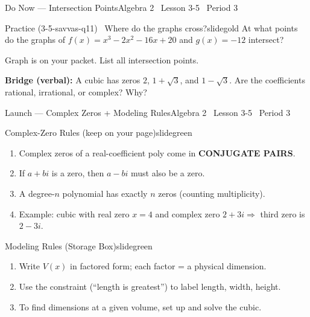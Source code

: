 \documentclass[aspectratio=169, 11pt]{beamer}
\begin{document}

\begin{frame}{Do Now --- Intersection Points}{Algebra 2 \textperiodcentered\ Lesson 3-5 \textperiodcentered\ Period 3}
\vspace{0.2cm}
\begin{projcard}{Practice (3-5-savvas-q11) \textperiodcentered\ Where do the graphs cross?}{slidegold}
At what points do the graphs of
\(f(x) = x^3 - 2x^2 - 16x + 20\) and \(g(x) = -12\) intersect?

\vspace{0.3cm}
\small\textcolor{slidegray}{Graph is on your packet. List all intersection points.}

\vspace{0.2cm}
\textbf{Bridge (verbal):} A cubic has zeros \(2\), \(1+\sqrt{3}\), and \(1-\sqrt{3}\).
Are the coefficients rational, irrational, or complex? Why?
\end{projcard}
\end{frame}

\begin{frame}{Launch --- Complex Zeros + Modeling Rules}{Algebra 2 \textperiodcentered\ Lesson 3-5 \textperiodcentered\ Period 3}
\vspace{0.2cm}
\begin{projcard}{Complex-Zero Rules (keep on your page)}{slidegreen}
\begin{enumerate}
  \setlength{\itemsep}{0pt}
  \item Complex zeros of a real-coefficient poly come in \textbf{CONJUGATE PAIRS}.
  \item If \(a+bi\) is a zero, then \(a-bi\) must also be a zero.
  \item A degree-\(n\) polynomial has exactly \(n\) zeros (counting multiplicity).
  \item Example: cubic with real zero \(x = 4\) and complex zero \(2+3i \Rightarrow\) third zero is \(2-3i\).
\end{enumerate}
\end{projcard}
\vspace{-0.1cm}
\begin{projcard}{Modeling Rules (Storage Box)}{slidegreen}
\begin{enumerate}
  \setlength{\itemsep}{0pt}
  \item Write \(V(x)\) in factored form; each factor = a physical dimension.
  \item Use the constraint (``length is greatest'') to label length, width, height.
  \item To find dimensions at a given volume, set up and solve the cubic.
\end{enumerate}
\end{projcard}
\end{frame}
\end{document}

